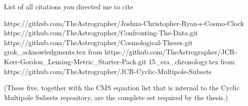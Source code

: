 List of all citations you directed me to cite

https://github.com/TheAstrographer/Joshua-Christopher-Ryan-s-Cosmo-Clock  
https://github.com/TheAstrographer/Confronting-The-Data.git  
https://github.com/TheAstrographer/Cosmological-Theses.git  
grok_acknowledgments.tex from https://github.com/TheAstrographer/JCR-Kerr-Gordon_Lensing-Metric_Starter-Pack.git  
15_era_chronology.tex from https://github.com/TheAstrographer/JCR-Cyclic-Multipole-Subsets  

(These five, together with the CMS equation list that is internal to the Cyclic Multipole Subsets repository, are the complete set required by the thesis.)
